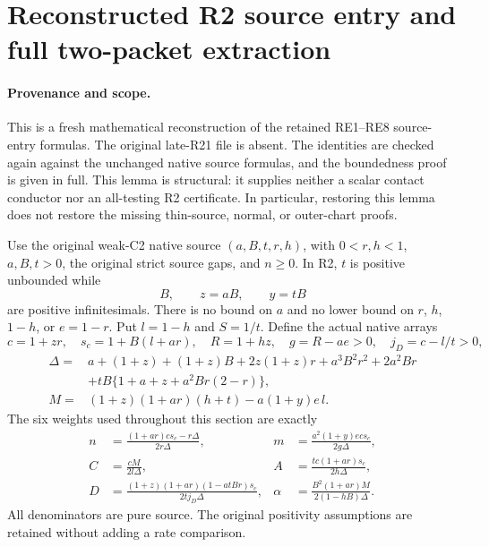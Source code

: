 \section{Reconstructed R2 source entry and full two-packet extraction}
\label{sec:r2-reconstructed-source-entry}

\paragraph{Provenance and scope.}
This is a fresh mathematical reconstruction of the retained RE1--RE8
source-entry formulas.  The original late-R21 file is absent.  The
identities are checked again against the unchanged native source
formulas, and the boundedness proof is given in full.  This lemma is
structural: it supplies neither a scalar contact conductor nor an
all-testing R2 certificate.  In particular, restoring this lemma does
not restore the missing thin-source, normal, or outer-chart proofs.

Use the original weak-C2 native source $(a,B,t,r,h)$, with
$0<r,h<1$, $a,B,t>0$, the original strict source gaps, and $n\geq0$.
In R2, $t$ is positive unbounded while
\[
 B,\qquad z=aB,\qquad y=tB
\]
are positive infinitesimals.  There is no bound on $a$ and no lower
bound on $r$, $h$, $1-h$, or $e=1-r$.  Put $l=1-h$ and $S=1/t$.
Define the actual native arrays
\[
 c=1+zr,\quad s_c=1+B(l+ar),\quad
 R=1+hz,\quad g=R-ae>0,\quad j_D=c-l/t>0,
\]
\begin{align*}
 \Delta={}&a+(1+z)+(1+z)B+2z(1+z)r
          +a^3B^2r^2+2a^2Br\\
          &+tB\{1+a+z+a^2Br(2-r)\},\\
 M={}&(1+z)(1+ar)(h+t)-a(1+y)e\,l.
\end{align*}
The six weights used throughout this section are exactly
\[
\begin{aligned}
 n&=\frac{(1+ar)c s_c-r\Delta}{2r\Delta},&
 m&=\frac{a^2(1+y)e c s_c}{2g\Delta},\\
 C&=\frac{cM}{2l\Delta},&
 A&=\frac{tc(1+ar)s_c}{2h\Delta},\\
 D&=\frac{(1+z)(1+ar)(1-atBr)s_c}{2t j_D\Delta},&
 \alpha&=\frac{B^2(1+ar)M}{2(1-hB)\Delta}.
\end{aligned}                                                     \tag{RER1}
\]
All denominators are pure source.  The original positivity assumptions
are retained without adding a rate comparison.

